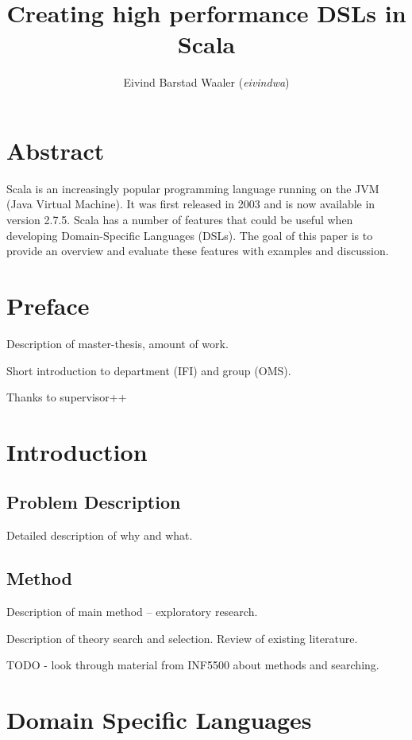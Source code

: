 \documentclass[a4paper,english]{report}
\title{Creating high performance DSLs in Scala}
\author{Eivind Barstad Waaler (\emph{eivindwa})}
\begin{document}
\uiosloforside[kind={Master thesis},boxcolor=matnat,textcolor=white]

\chapter{Abstract}

Scala is an increasingly popular programming language running on the
JVM (Java Virtual Machine). It was first released in 2003 and is now
available in version 2.7.5. Scala has a number of features that could
be useful when developing Domain-Specific Languages (DSLs). The goal
of this paper is to provide an overview and evaluate these features
with examples and discussion.

\tableofcontents

\listoftables

\listoffigures

\chapter{Preface}

Description of master-thesis, amount of work.

Short introduction to department (IFI) and group (OMS).

Thanks to supervisor++

\chapter{Introduction}

\section{Problem Description}

Detailed description of why and what. 

\section{Method}

Description of main method -- exploratory research.

Description of theory search and selection. Review of existing
literature.

TODO - look through material from INF5500 about methods and searching.

\chapter{Domain Specific Languages}
\end{document}
